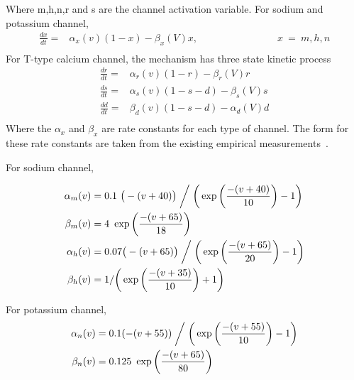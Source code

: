 Where m,h,n,r and s are the channel activation variable. 
For sodium and potassium channel,
\begin{align*}
\frac{dx}{dt} =&\alpha_{x}(v)(1-x) - \beta_{x}(V)x, \hspace{8em}  x\ =\ m,h,n \\
\end{align*}
For T-type calcium channel, the mechanism has three state kinetic process
\begin{align*}
\frac{dr}{dt} =& \alpha_{r}(v)(1-r) - \beta_r(V)r \\
\frac{ds}{dt} =& \alpha_{s}(v)(1-s-d) - \beta_{s}(V)s \\
\frac{d d}{dt} =& \beta_{d}(v)(1-s-d) - \alpha_d(V)d \\
\end{align*}
Where the $\alpha_x$ and $\beta_x$ are rate constants for each type of channel. The form for these rate constants are taken from the existing empirical measurements~\cite{hodgkin1952quantitative,carnevale2006neuron, wang1991model}.

For sodium channel, %

\begin{align*} 
\alpha_{m}(v) &= 0.1\  \big(-(v+40)\big)  \biggm/  \bigg( \exp \bigg( \frac{-(v+40)}{10} \bigg) - 1 \bigg)\\
\beta_{m}(v) &= 4\ \exp \bigg(\frac{-(v+65)}{18}\bigg)\\
\alpha_{h}(v) &= 0.07\big(-(v+65)\big)  \biggm/  \bigg( \exp \bigg( \frac{-(v+65)}{20} \bigg) - 1 \bigg)\\
\beta_{h}(v) &= 1 / \bigg( \exp \bigg(\frac{-(v+35)}{10}\bigg) + 1 \bigg)\\
\end{align*}

For potassium channel, %
\begin{align*}
\alpha_{n}(v)&=0.1(-(v+55))  \biggm/  \bigg( \exp \bigg( \frac{-(v+55)}{10} \bigg) - 1 \bigg)\\
\beta_{n}(v)&=0.125\ \exp \bigg(\frac{-(v+65)}{80}\bigg)\\
\end{align*}

